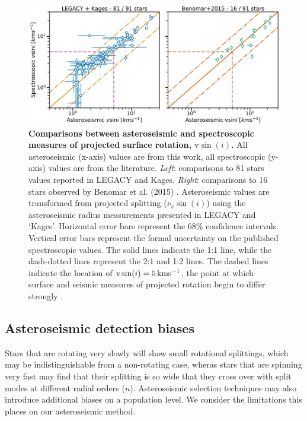 \begin{figure}[h!]
	\centering
	\includegraphics[width=\textwidth]{Images/vsini_comparison_new.pdf}
	\caption{\textbf{Comparisons between asteroseismic and spectroscopic measures of projected surface rotation, $\textrm{v}\sin(i)$.} All asteroseismic (x-axis) values are from this work, all spectroscopic (y-axis) values are from the literature. \textit{Left}: comparisons to 81 stars values reported in LEGACY and Kages. \textit{Right}: comparisons to 16 stars observed by Benomar et al. (2015) \cite{benomar+2015}. Asteroseismic values are transformed from projected splitting ($\nu_s\sin(i)$) using the asteroseismic radius measurements presented in LEGACY and `Kages'. Horizontal error bars represent the 68\% confidence intervals. Vertical error bars represent the formal uncertainty on the published spectroscopic values. The solid lines indicate the 1:1 line, while the dash-dotted lines represent the 2:1 and 1:2 lines. The dashed lines indicate the location of $\textrm{v}\sin(i) = 5\, \rm{kms^{-1}}$, the point at which surface and seismic measures of projected rotation begin to differ strongly \cite{tayar+2015}.}
	\label{fig:vsinilit}
\end{figure}


\subsection{Asteroseismic detection biases}

Stars that are rotating very slowly will show small rotational splittings, which may be indistinguishable from a non-rotating case, wheras stars that are spinning very fast may find that their splitting is so wide that they cross over with split modes at different radial orders ($n$). Asteroseismic selection techniques may also introduce additional biases on a population level. We consider the limitations this places on our asteroseismic method.

